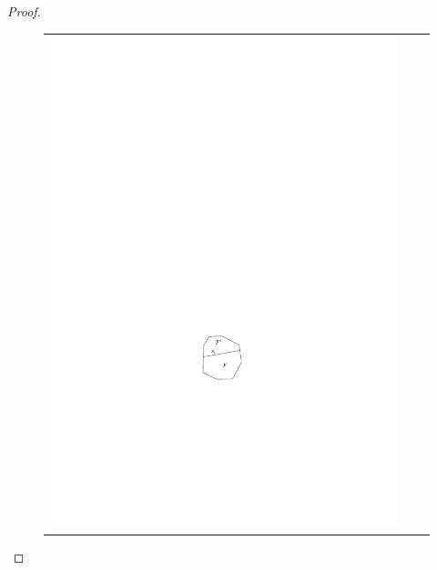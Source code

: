 \documentclass{article}
\begin{document}
\begin{proof}
\begin{figure}
  \begin{center}
    \begin{tabular}{ccc}
      \includegraphics{chop-a} &   

\end{tabular}
\end{center}
\end{figure}
\end{proof}
\end{document}
